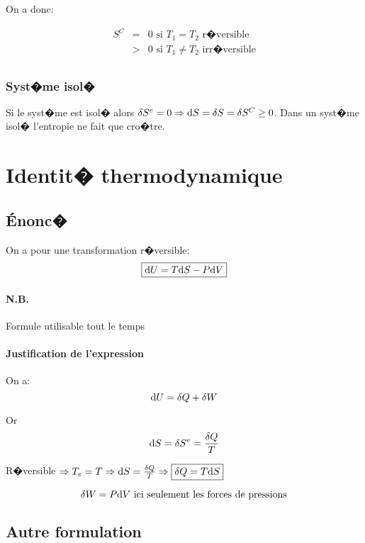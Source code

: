 On a donc:


\begin{eqnarray*}
	S^C 	& = & 0 \text{ si } T_1 = T_2 \text{ r�versible}\\
		& > & 0 \text{ si } T_1 \neq T_2 \text{ irr�versible}\\
\end{eqnarray*}

\subsubsection{Syst�me isol�}

Si le syst�me est isol� alors $\delta S^e = 0 \Rightarrow \mathrm{d} S = \delta S = \delta S^C \geq 0$. Dans un syst�me isol� l'entropie ne fait que cro�tre.

\section{Identit� thermodynamique}
\subsection{\'E{}nonc�}
On a pour une transformation r�versible:
\[
	\boxed{\mathrm{d} U = T \mathrm{d} S - P \mathrm{d} V}
\]

\paragraph{N.B.} Formule utilisable tout le temps

\paragraph{Justification de l'expression} On a:
\[
	\mathrm{d} U = \delta Q + \delta W
\]

Or
\[
	\mathrm{d} S = \delta S^e = \frac{\delta Q}{T}
\]

R�versible $ \Rightarrow T_e = T \Rightarrow \mathrm{d} S = \frac{\delta Q}{T} \Rightarrow \boxed{\delta Q = T \mathrm{d} S}$

\[
	\delta W = P \mathrm{d} V \text{ ici seulement les forces de pressions}
\]

\subsection{Autre formulation}

